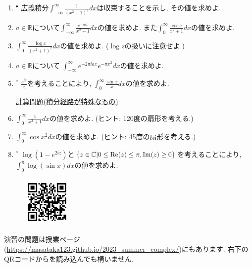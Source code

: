 \documentclass[dvipdfmx,a4paper,11pt]{article}
\newcommand{\R}{\mathbb{R}}
\newcommand{\C}{\mathbb{C}}
\theoremstyle{definition}
\begin{document}
\begin{enumerate}[label=\textbf{問}2.\arabic*]
  \item $^{\bullet}$  広義積分$\int_{ - \infty}^{\infty}\frac{1}{(x^2+ 1)^{2}} dx$は収束することを示し, その値を求めよ.
  
 \item $a \in \R$について$\int_{- \infty}^{\infty}\frac{e^{-iax}}{x^2+1} dx$の値を求めよ. また$\int_{0}^{\infty}\frac{\cos x}{x^2 + 1} dx$の値を求めよ.
 
  \item $\int_{0}^{\infty} \frac{\log x}{(x^2 + 1)^2} dx$の値を求めよ. ($\log z$の扱いに注意せよ.)

 \item $a \in \R$について $\int_{- \infty}^{\infty} e^{-2 \pi i a x } e^{- \pi x^2}dx$の値を求めよ.
 
\item   $^{*}$ $\frac{e^{iz}}{z}$を考えることにより, $\int_{0}^{\infty}\frac{\sin x}{x} dx$の値を求めよ.
        
 \newpage 
  \vspace{12pt}
\hspace{-36pt}\underline{計算問題(積分経路が特殊なもの)}

   \item  $\int_{0}^{\infty}\frac{1}{x^3+ 1} dx$の値を求めよ. (ヒント: 120度の扇形を考える.)
   
\item $\int_{0}^{\infty}\cos x^2 dx$の値を求めよ. (ヒント: 45度の扇形を考える.)

\item $^{*}$  $\log(1-e^{2iz})$と$\{ z \in \C | 0 \le {\rm Re}(z) \le \pi, {\rm Im}(z) \ge 0\}$を考えることにより, $\int_{0}^{\pi}\log (\sin x) dx$の値を求めよ.
 
 \end{enumerate}


 
 \vspace{11pt}\begin{figure}  \centering\includegraphics[height=25mm, width=25mm]{complex.png}\end{figure}

演習の問題は授業ページ(\url{https://masataka123.github.io/2023_summer_complex/})にもあります. 右下のQRコードからを読み込んでも構いません.


  
  
 
\end{document}
